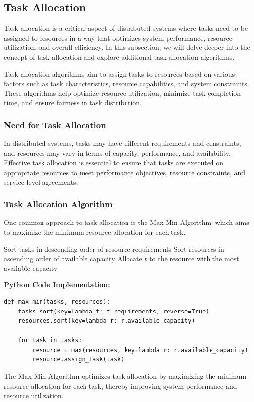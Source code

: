 \documentclass[12pt]{book} %
\begin{document}
\subsection{Task Allocation}

Task allocation is a critical aspect of distributed systems where tasks need to be assigned to resources in a way that optimizes system performance, resource utilization, and overall efficiency. In this subsection, we will delve deeper into the concept of task allocation and explore additional task allocation algorithms.

Task allocation algorithms aim to assign tasks to resources based on various factors such as task characteristics, resource capabilities, and system constraints. These algorithms help optimize resource utilization, minimize task completion time, and ensure fairness in task distribution.

\subsubsection{Need for Task Allocation}

In distributed systems, tasks may have different requirements and constraints, and resources may vary in terms of capacity, performance, and availability. Effective task allocation is essential to ensure that tasks are executed on appropriate resources to meet performance objectives, resource constraints, and service-level agreements.

\subsubsection{Task Allocation Algorithm}

One common approach to task allocation is the Max-Min Algorithm, which aims to maximize the minimum resource allocation for each task.
\FloatBarrier
\begin{algorithm}[H]
\caption{Max-Min Algorithm}\label{alg:max_min}
\begin{algorithmic}[1]
\State Sort tasks in descending order of resource requirements
\State Sort resources in ascending order of available capacity
    \State Allocate $t$ to the resource with the most available capacity
\EndFor
\EndProcedure
\end{algorithmic}
\end{algorithm}
\FloatBarrier   
\textbf{Python Code Implementation:}
\FloatBarrier
\begin{lstlisting}
def max_min(tasks, resources):
    tasks.sort(key=lambda t: t.requirements, reverse=True)
    resources.sort(key=lambda r: r.available_capacity)
    
    for task in tasks:
        resource = max(resources, key=lambda r: r.available_capacity)
        resource.assign_task(task)
\end{lstlisting}
\FloatBarrier
The Max-Min Algorithm optimizes task allocation by maximizing the minimum resource allocation for each task, thereby improving system performance and resource utilization.
\end{document}
